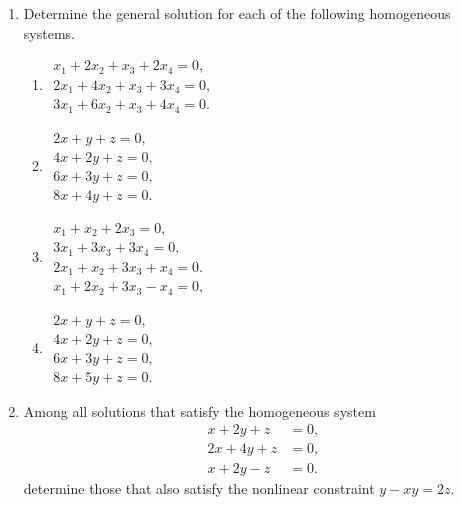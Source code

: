 \begin{enumerate}[leftmargin=*, label=\bfseries 2.4.\arabic*]

\item Determine the general solution for each of the following homogeneous systems.

\begin{enumerate}[label=(\alph*)]
    \item \(\begin{array}{l}
    x_1 + 2x_2 + x_3 + 2x_4 = 0, \\
    2x_1 + 4x_2 + x_3 + 3x_4 = 0, \\
    3x_1 + 6x_2 + x_3 + 4x_4 = 0.
    \end{array}\)
    
    \item \(\begin{array}{l}
    2x + y + z = 0, \\
    4x + 2y + z = 0, \\
    6x + 3y + z = 0, \\
    8x + 4y + z = 0.
    \end{array}\)
    
    \item \(\begin{array}{l}
    x_1 + x_2 + 2x_3 = 0, \\
    3x_1 + 3x_3 + 3x_4 = 0, \\
    2x_1 + x_2 + 3x_3 + x_4 = 0. \\
    x_1 + 2x_2 + 3x_3 - x_4 = 0,
    \end{array}\)

    \item \(\begin{array}{l}
    2x + y + z = 0, \\
    4x + 2y + z = 0, \\
    6x + 3y + z = 0, \\
    8x + 5y + z = 0.
    \end{array}\)
\end{enumerate}

\item Among all solutions that satisfy the homogeneous system
\[
\begin{align}
x + 2y + z &= 0, \\
2x + 4y + z &= 0, \\
x + 2y - z &=0.
\end{align}
\]
determine those that also satisfy the nonlinear constraint \(y - xy = 2z\).


\end{enumerate}

